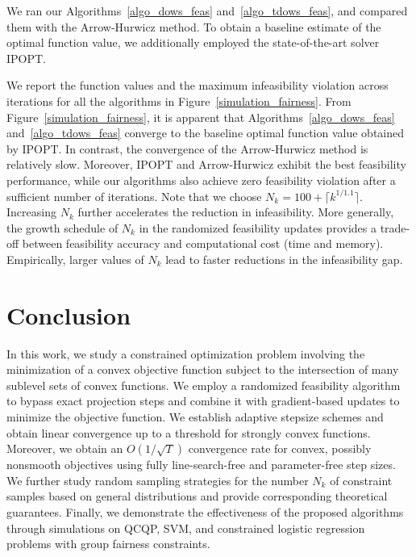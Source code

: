 \documentclass{article}
\theoremstyle{plain}
\theoremstyle{definition}
\theoremstyle{remark}
\begin{document}
We ran our Algorithms~\ref{algo_dows_feas} and~\ref{algo_tdows_feas}, and compared them with the Arrow-Hurwicz method. To obtain a baseline estimate of the optimal function value, we additionally employed the state-of-the-art solver IPOPT.


We report the function values and the maximum infeasibility violation across iterations for all the algorithms in Figure~\ref{simulation_fairness}. 
From Figure~\ref{simulation_fairness}, it is apparent that Algorithms~\ref{algo_dows_feas} and~\ref{algo_tdows_feas} converge to the baseline optimal function value obtained by IPOPT. In contrast, the convergence of the Arrow-Hurwicz method is relatively slow. Moreover, IPOPT and Arrow-Hurwicz exhibit the best feasibility performance, while our algorithms also achieve zero feasibility violation after a sufficient number of iterations. Note that we choose $N_k = 100 + \lceil k^{1/1.1} \rceil$. Increasing $N_k$ further accelerates the reduction in infeasibility. More generally, the growth schedule of $N_k$ in the randomized feasibility updates provides a trade-off between feasibility accuracy and computational cost (time and memory). Empirically, larger values of $N_k$ lead to faster reductions in the infeasibility gap.









\section{Conclusion}\label{sec:conclusion} 

In this work, we study a constrained optimization problem involving the minimization of a convex objective function subject to the intersection of many sublevel sets of convex functions. We employ a randomized feasibility algorithm to bypass exact projection steps and combine it with gradient-based updates to minimize the objective function. We establish adaptive stepsize schemes and obtain linear convergence up to a threshold for strongly convex functions. Moreover, we obtain an \(O(1/\sqrt{T})\) convergence rate for convex, possibly nonsmooth objectives using fully line-search-free and parameter-free step sizes. We further study random sampling strategies for the number $N_k$ of constraint samples based on general distributions and provide corresponding theoretical guarantees. Finally, we demonstrate the effectiveness of the proposed algorithms through simulations on QCQP, SVM, and constrained logistic regression problems with group fairness constraints.
\end{document}
